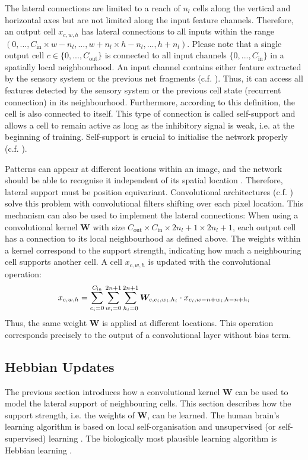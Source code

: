 The lateral connections are limited to a reach of $n_{l}$ cells along the vertical and horizontal axes but are not limited along the input feature channels.
Therefore, an output cell $x_{c,w,h}$ has lateral connections to all inputs within the range $(0, ..., C_{\text{in}} \times w - n_l, ..., w+n_l \times h - n_l, ..., h+n_l)$.
Please note that a single output cell $c \in \{0, ..., C_{\text{out}}\}$ is connected to all input channels $\{0, ..., C_{\text{in}}\}$ in a spatially local neighbourhood. An input channel contains either feature extracted by the sensory system or the previous net fragments (c.f. ). Thus, it can access all features detected by the sensory system or the previous cell state (recurrent connection) in its neighbourhood.
Furthermore, according to this definition, the cell is also connected to itself.
This type of connection is called self-support and allows a cell to remain active as long as the inhibitory signal is weak, i.e. at the beginning of training.
Self-support is crucial to initialise the network properly (c.f. ).

Patterns can appear at different locations within an image, and the network should be able to recognise it independent of its spatial location . 
Therefore, lateral support must be position equivariant.
Convolutional architectures (c.f. ) solve this problem with convolutional filters shifting over each pixel location. This mechanism can also be used to implement the lateral connections: When using a convolutional kernel $\boldsymbol{W}$ with size $C_{\text{out}} \times C_{\text{in}} \times 2n_l+1 \times 2n_l+1$, each output cell has a connection to its local neighbourhood as defined above.
The weights within a kernel correspond to the support strength, indicating how much a neighbouring cell supports another cell. A cell $x_{c,w,h}$ is updated with the convolutional operation: 
%
\begin{align}\eqlbl{convlat_1}
	x_{c,w,h} = \sum_{c_i=0}^{C_{\text{in}}} \sum_{w_i=0}^{2n+1} \sum_{h_i=0}^{2n+1} \boldsymbol{W}_{c, c_i,w_i,h_i} \cdot x_{c_i,w-n+w_i,h-n+h_i}
\end{align}
%
Thus, the same weight $\boldsymbol{W}$ is applied at different locations.
This operation corresponds precisely to the output of a convolutional layer without bias term.


\subsection{Hebbian Updates}
The previous section introduces how a convolutional kernel $\boldsymbol{W}$ can be used to model the lateral support of neighbouring cells.
This section describes how the support strength, i.e. the weights of $\boldsymbol{W}$, can be learned.
The human brain's learning algorithm is based on local self-organisation and unsupervised (or self-supervised) learning . The biologically most plausible learning algorithm is Hebbian learning .

